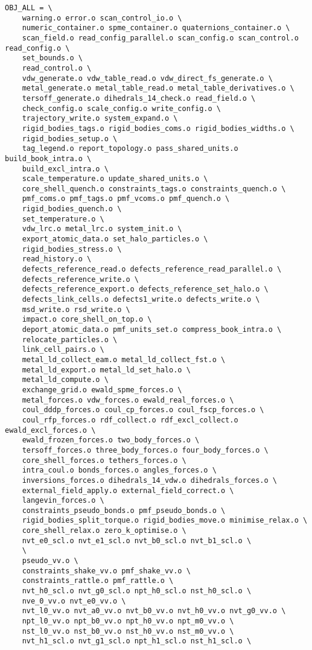 \begin{verbatim}
OBJ_ALL = \
	warning.o error.o scan_control_io.o \
	numeric_container.o spme_container.o quaternions_container.o \
	scan_field.o read_config_parallel.o scan_config.o scan_control.o read_config.o \
	set_bounds.o \
	read_control.o \
	vdw_generate.o vdw_table_read.o vdw_direct_fs_generate.o \
	metal_generate.o metal_table_read.o metal_table_derivatives.o \
	tersoff_generate.o dihedrals_14_check.o read_field.o \
	check_config.o scale_config.o write_config.o \
	trajectory_write.o system_expand.o \
	rigid_bodies_tags.o rigid_bodies_coms.o rigid_bodies_widths.o \
	rigid_bodies_setup.o \
	tag_legend.o report_topology.o pass_shared_units.o build_book_intra.o \
	build_excl_intra.o \
	scale_temperature.o update_shared_units.o \
	core_shell_quench.o constraints_tags.o constraints_quench.o \
	pmf_coms.o pmf_tags.o pmf_vcoms.o pmf_quench.o \
	rigid_bodies_quench.o \
	set_temperature.o \
	vdw_lrc.o metal_lrc.o system_init.o \
	export_atomic_data.o set_halo_particles.o \
	rigid_bodies_stress.o \
	read_history.o \
	defects_reference_read.o defects_reference_read_parallel.o \
	defects_reference_write.o \
	defects_reference_export.o defects_reference_set_halo.o \
	defects_link_cells.o defects1_write.o defects_write.o \
	msd_write.o rsd_write.o \
	impact.o core_shell_on_top.o \
	deport_atomic_data.o pmf_units_set.o compress_book_intra.o \
	relocate_particles.o \
	link_cell_pairs.o \
	metal_ld_collect_eam.o metal_ld_collect_fst.o \
	metal_ld_export.o metal_ld_set_halo.o \
	metal_ld_compute.o \
	exchange_grid.o ewald_spme_forces.o \
	metal_forces.o vdw_forces.o ewald_real_forces.o \
	coul_dddp_forces.o coul_cp_forces.o coul_fscp_forces.o \
	coul_rfp_forces.o rdf_collect.o rdf_excl_collect.o ewald_excl_forces.o \
	ewald_frozen_forces.o two_body_forces.o \
	tersoff_forces.o three_body_forces.o four_body_forces.o \
	core_shell_forces.o tethers_forces.o \
	intra_coul.o bonds_forces.o angles_forces.o \
	inversions_forces.o dihedrals_14_vdw.o dihedrals_forces.o \
	external_field_apply.o external_field_correct.o \
	langevin_forces.o \
	constraints_pseudo_bonds.o pmf_pseudo_bonds.o \
	rigid_bodies_split_torque.o rigid_bodies_move.o minimise_relax.o \
	core_shell_relax.o zero_k_optimise.o \
	nvt_e0_scl.o nvt_e1_scl.o nvt_b0_scl.o nvt_b1_scl.o \
	\
	pseudo_vv.o \
	constraints_shake_vv.o pmf_shake_vv.o \
	constraints_rattle.o pmf_rattle.o \
	nvt_h0_scl.o nvt_g0_scl.o npt_h0_scl.o nst_h0_scl.o \
	nve_0_vv.o nvt_e0_vv.o \
	nvt_l0_vv.o nvt_a0_vv.o nvt_b0_vv.o nvt_h0_vv.o nvt_g0_vv.o \
	npt_l0_vv.o npt_b0_vv.o npt_h0_vv.o npt_m0_vv.o \
	nst_l0_vv.o nst_b0_vv.o nst_h0_vv.o nst_m0_vv.o \
	nvt_h1_scl.o nvt_g1_scl.o npt_h1_scl.o nst_h1_scl.o \

\end{verbatim}
